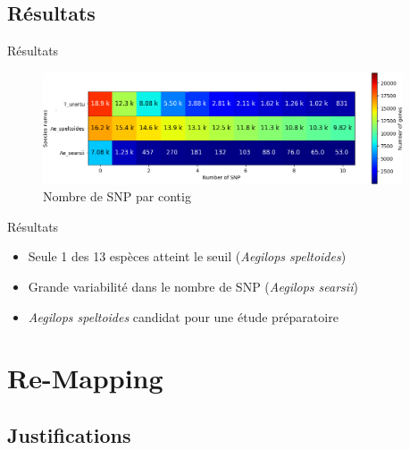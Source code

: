 \subsection{Résultats}
\begin{frame}{Résultats}

    \begin{figure}[h!]
        \centering
        \includegraphics[width=0.95\textwidth]{Illustrations/Classic_results.png}
        \caption{Nombre de SNP par contig}
        \label{fig:heatmap_snp}
    \end{figure}

    \pause

    \begin{alertblock}{Résultats}
        \begin{itemize}
            \small
            \item Seule 1 des 13 espèces atteint le seuil (\textit{Aegilops speltoides})
            \item Grande variabilité dans le nombre de SNP (\textit{Aegilops searsii})
            \item \textit{Aegilops speltoides} candidat pour une étude préparatoire
        \end{itemize}
    \end{alertblock}

\end{frame}




\section{Re-Mapping}
\subsection{Justifications}
\begin{frame}
	\tableofcontents[sectionstyle=show/shaded,subsectionstyle=show/show/hide,subsubsectionstyle=show/show/hide]
\end{frame}

